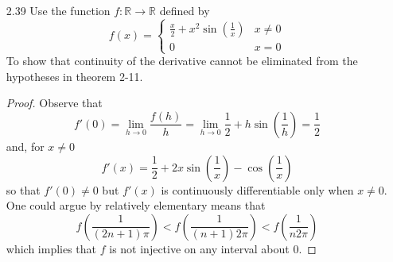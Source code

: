 \begin{enumerate}
\begin{proof}
\begin{enumerate}
        \item We see that
        \[
        f'(x,y) = \begin{bmatrix} \cos(y)e^x & -e^x\sin(y) \\ \sin(y)e^x & e^x\cos(y) \end{bmatrix}
        \]
        so that
        \[
        det f'(x,y) = e^{2x}(\cos^2(y)+\sin^2(y)) = e^{2x} \neq 0 \:\:\: \forall (x,y)
        \]
        and yet \( f(0,0) = (1,0) = f(0, 2\pi) \).
    \end{enumerate}
    \end{proof}
    
    \item[2.39] Use the function \( f: \mathbb{R} \rightarrow \mathbb{R} \) defined by
    \[
    f(x) = \begin{cases} \frac{x}{2} + x^2 \sin\left( \frac{1}{x} \right) & x \neq 0 \\ 0 & x = 0 \end{cases}
    \]
    To show that continuity of the derivative cannot be eliminated from the hypotheses in theorem 2-11.
    
    \begin{proof}
    Observe that
    \[
    f'(0) = \lim_{h \rightarrow 0} \frac{f(h)}{h} = \lim_{h \rightarrow 0}\frac{1}{2} + h \sin\left(\frac{1}{h}\right) = \frac{1}{2}
    \]
    and, for \( x \neq 0 \)
    \[
    f'(x) = \frac{1}{2} + 2x\sin\left(\frac{1}{x} \right) -\cos\left( \frac{1}{x} \right)
    \]
    so that \( f'(0) \neq 0 \) but \( f'(x) \) is continuously differentiable only when \( x \neq 0 \). One could argue by relatively elementary means that
    \[
    f\left( \frac{1}{(2n+1)\pi} \right)  < f\left( \frac{1}{(n+1)2\pi} \right) < f\left( \frac{1}{n2\pi} \right) 
    \]
     which implies that \( f \) is not injective on any interval about \( 0 \). 
    \end{proof}
    

\end{enumerate}
